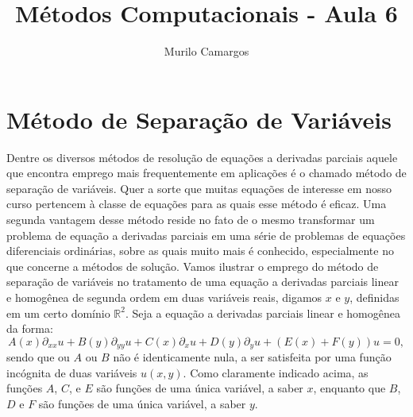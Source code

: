 \documentclass[10pt,a4paper]{article}
\author{Murilo Camargos}
\title{Métodos Computacionais - Aula 6}
\begin{document}

	\section{Método de Separação de Variáveis}
	Dentre os diversos métodos de resolução de equações a derivadas parciais aquele que encontra emprego mais frequentemente em aplicações é o chamado método de separação de variáveis. Quer a sorte que muitas equações de interesse em nosso curso pertencem à classe de equações para as quais esse método é eficaz. Uma segunda vantagem desse método reside no fato de o mesmo transformar um problema de equação a derivadas parciais em uma série de problemas de equações diferenciais ordinárias, sobre as quais muito mais é conhecido, especialmente no que concerne a métodos de solução. Vamos ilustrar o emprego do método de separação de variáveis no tratamento de uma equação a derivadas parciais linear e homogênea de segunda ordem em duas variáveis reais, digamos $x$ e $y$, definidas em um certo domínio $\mathbb{R}^2$. Seja a equação a derivadas parciais linear e homogênea da forma:
	\begin{equation}
		A(x)\partial_{xx}u + B(y)\partial_{yy}u + C(x)\partial_x u + D(y)\partial_y u + (E(x)+F(y)) u = 0,
		\label{eq:1}
	\end{equation}
	sendo que ou $A$ ou $B$ não é identicamente nula, a ser satisfeita por uma função incógnita de duas variáveis $u(x,y)$. Como claramente indicado acima, as funções $A$, $C$, e $E$ são funções de uma única variável, a saber $x$, enquanto que $B$, $D$ e $F$ são funções de uma única variável, a saber $y$.
	
\end{document}
